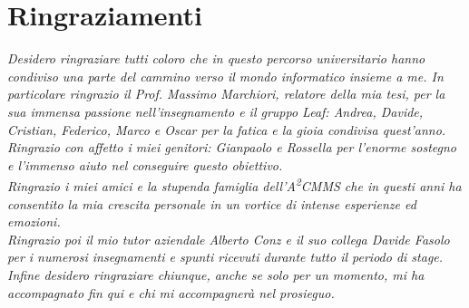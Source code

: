 
\cleardoublepage
{}
{}

\begingroup
\let\clearpage\relax
\let\cleardoublepage\relax
\let\cleardoublepage\relax

\chapter*{Ringraziamenti}

\noindent \textit{Desidero ringraziare tutti coloro che in questo percorso universitario hanno condiviso una parte del cammino verso il mondo informatico insieme a me. In particolare ringrazio il Prof. Massimo Marchiori, relatore della mia tesi, per la sua immensa passione nell'insegnamento e il gruppo Leaf: Andrea, Davide, Cristian, Federico, Marco e Oscar per la fatica e la gioia condivisa quest'anno.}\\

\noindent \textit{Ringrazio con affetto i miei genitori: Gianpaolo e Rossella per l'enorme sostegno e l'immenso aiuto nel conseguire questo obiettivo.}\\

\noindent \textit{Ringrazio i miei amici e la stupenda famiglia dell'A\textsuperscript{2}CMMS che in questi anni ha consentito la mia crescita personale in un vortice di intense esperienze ed emozioni.}\\

\noindent \textit{Ringrazio poi il mio tutor aziendale Alberto Conz e il suo collega Davide Fasolo per i numerosi insegnamenti e spunti ricevuti durante tutto il periodo di stage.}\\

\noindent \textit{Infine desidero ringraziare chiunque, anche se solo per un momento, mi ha accompagnato fin qui e chi mi accompagnerà nel prosieguo.}\\
\bigskip

\noindent\textit{\myTime}
\hfill \myName

\endgroup

